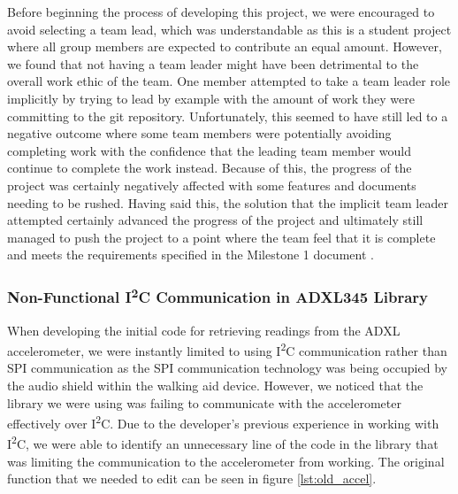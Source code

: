                 Before beginning the process of developing this project, we were encouraged to avoid selecting a team lead, which was understandable as this is a student project where all group members are expected to contribute an equal amount. However, we found that not having a team leader might have been detrimental to the overall work ethic of the team. One member attempted to take a team leader role implicitly by trying to lead by example with the amount of work they were committing to the git repository. Unfortunately, this seemed to have still led to a negative outcome where some team members were potentially avoiding completing work with the confidence that the leading team member would continue to complete the work instead. Because of this, the progress of the project was certainly negatively affected with some features and documents needing to be rushed. Having said this, the solution that the implicit team leader attempted certainly advanced the progress of the project and ultimately still managed to push the project to a point where the team feel that it is complete and meets the requirements specified in the Milestone 1 document \cite{coaker}.

            \subsubsection{Non-Functional I\textsuperscript{2}C Communication in ADXL345 Library}
            \label{subsubsec:ADXL}

                When developing the initial code for retrieving readings from the ADXL accelerometer, we were instantly limited to using I\textsuperscript{2}C communication rather than SPI communication as the SPI communication technology was being occupied by the audio shield within the walking aid device. However, we noticed that the library we were using was failing to communicate with the accelerometer effectively over I\textsuperscript{2}C. Due to the developer's previous experience in working with I\textsuperscript{2}C, we were able to identify an unnecessary line of the code in the library that was limiting the communication to the accelerometer from working. The original function that we needed to edit can be seen in figure \ref{lst:old_accel}.

                

